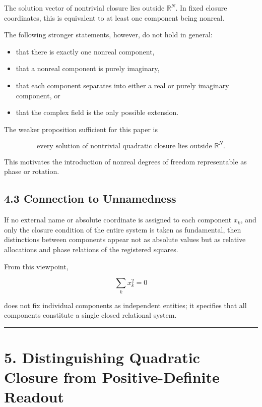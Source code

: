 \documentclass[
  a4paper,
  10pt]{article}
\providecommand{\tightlist}{%
  \setlength{\itemsep}{0pt}\setlength{\parskip}{0pt}}
\begin{document}
The solution vector of nontrivial closure lies outside \(\mathbb R^N\).
In fixed closure coordinates, this is equivalent to at least one
component being nonreal.

The following stronger statements, however, do not hold in general:

\begin{itemize}
\tightlist
\item
  that there is exactly one nonreal component,
\item
  that a nonreal component is purely imaginary,
\item
  that each component separates into either a real or purely imaginary
  component, or
\item
  that the complex field is the only possible extension.
\end{itemize}

The weaker proposition sufficient for this paper is

\[
\boxed{
\text{every solution of nontrivial quadratic closure lies outside }\mathbb R^N
}.
\]

This motivates the introduction of nonreal degrees of freedom
representable as phase or rotation.

\subsection{4.3 Connection to
Unnamedness}\label{43-connection-to-unnamedness}

If no external name or absolute coordinate is assigned to each component
\(x_k\), and only the closure condition of the entire system is taken as
fundamental, then distinctions between components appear not as absolute
values but as relative allocations and phase relations of the registered
squares.

From this viewpoint,

\[
\sum_kx_k^2=0
\]

does not fix individual components as independent entities; it specifies
that all components constitute a single closed relational system.

\begin{center}\rule{0.5\linewidth}{0.5pt}\end{center}

\section{5. Distinguishing Quadratic Closure from Positive-Definite
Readout}\label{5-distinguishing-quadratic-closure-from-positive-definite-readout}
\end{document}
